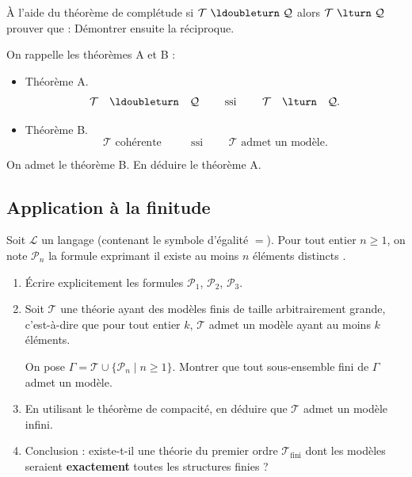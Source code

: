 \documentclass[11pt,class=report,crop=false]{standalone}
\begin{document}
\begin{exercicecours}
	À l'aide du théorème de complétude \og{}si $\mathcal{T} \ \ldoubleturn \ \mathcal{Q}$ alors 
    $\mathcal{T} \ \lturn \ \mathcal{Q}$\fg{} prouver que :
    Démontrer ensuite la réciproque.
\end{exercicecours}


\begin{exercicecours}
	On rappelle les théorèmes A et B :
	\begin{itemize}
		\item Théorème A. 
		\[	
		\mathcal{T} \quad \ldoubleturn \quad \mathcal{Q}
		\qquad \text{ ssi } \qquad 
		\mathcal{T} \quad \lturn \quad \mathcal{Q}.
		\]
		
		\item Théorème B.
		\[
		\mathcal{T} \text{ cohérente }
		\qquad \text{ ssi }\qquad 
		\mathcal{T} \text{ admet un modèle}.
		\]
	\end{itemize}
	
	On admet le théorème B. En déduire le théorème A.	
\end{exercicecours}



\subsection*{Application à la finitude}

\begin{exercicecours}
	Soit $\mathcal{L}$ un langage (contenant le symbole d'égalité $=$). 
	Pour tout entier $n \geq 1$, on note $\mathcal{P}_n$ la formule exprimant \og{}il existe au moins $n$ éléments distincts \fg{}.
	
	\begin{enumerate}
		\item Écrire explicitement les formules $\mathcal{P}_1$, $\mathcal{P}_2$, $\mathcal{P}_3$.
		
		\item Soit $\mathcal{T}$ une théorie ayant des modèles finis de taille arbitrairement grande, c'est-à-dire que pour tout entier $k$, $\mathcal{T}$ admet un modèle ayant au moins $k$ éléments. 
		
		On pose $\Gamma = \mathcal{T} \cup \{ \mathcal{P}_n \mid n \geq 1 \}$. Montrer que tout sous-ensemble fini de $\Gamma$ admet un modèle.
		
		\item En utilisant le théorème de compacité, en déduire que $\mathcal{T}$ admet un modèle infini.
		
		\item Conclusion : existe-t-il une théorie du premier ordre $\mathcal{T}_{\text{fini}}$ dont les modèles seraient \textbf{exactement} toutes les structures finies ?
	\end{enumerate}
\end{exercicecours}
\end{document}
